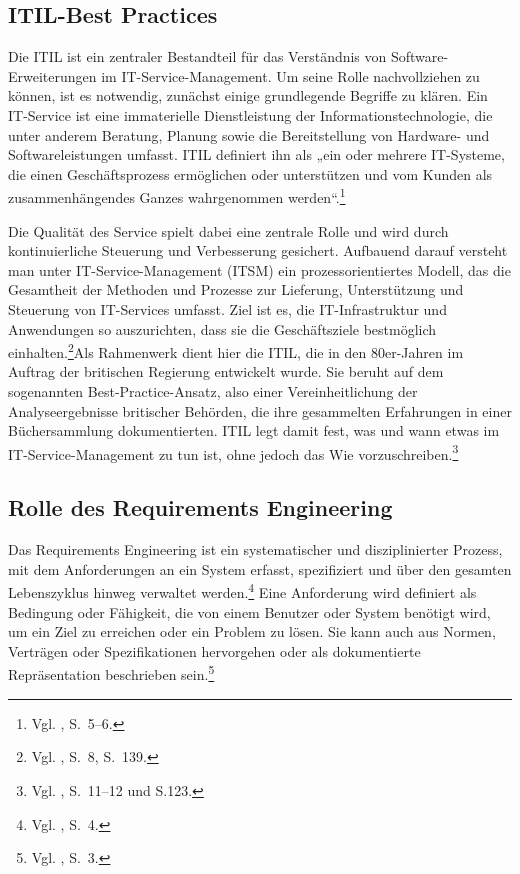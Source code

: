 \documentclass[
    12pt, 
    a4paper,
    ]{scrartcl} %
\begin{document}
\subsection{ITIL-Best Practices}

Die ITIL ist ein zentraler Bestandteil für das Verständnis von Software-Erweiterungen im IT-Service-Management. Um seine Rolle nachvollziehen zu können, ist es notwendig, zunächst einige grundlegende Begriffe zu klären. Ein IT-Service ist eine immaterielle Dienstleistung der Informationstechnologie, die unter anderem Beratung, Planung sowie die Bereitstellung von Hardware- und Softwareleistungen umfasst. ITIL definiert ihn als „ein oder mehrere IT-Systeme, die einen Geschäftsprozess ermöglichen oder unterstützen und vom Kunden als zusammenhängendes Ganzes wahrgenommen werden“.\footnote{Vgl. \cite{S_ITIL}, S.~5--6.} 

Die Qualität des Service spielt dabei eine zentrale Rolle und wird durch kontinuierliche Steuerung und Verbesserung gesichert. Aufbauend darauf versteht man unter IT-Service-Management (ITSM) ein prozessorientiertes Modell, das die Gesamtheit der Methoden und Prozesse zur Lieferung, Unterstützung und Steuerung von IT-Services umfasst. Ziel ist es, die IT-Infrastruktur und Anwendungen so auszurichten, dass sie die Geschäftsziele bestmöglich einhalten.\footnote{Vgl. \cite{S_ITIL}, S.~8, S.~139.}Als Rahmenwerk dient hier die ITIL, die in den 80er-Jahren im Auftrag der britischen Regierung entwickelt wurde. Sie beruht auf dem sogenannten Best-Practice-Ansatz, also einer Vereinheitlichung der Analyseergebnisse britischer Behörden, die ihre gesammelten Erfahrungen in einer Büchersammlung dokumentierten. ITIL legt damit fest, was und wann etwas im IT-Service-Management zu tun ist, ohne jedoch das Wie vorzuschreiben.\footnote{Vgl. \cite{S_ITIL}, S.~11--12 und S.123.}

\subsection{Rolle des Requirements Engineering}

Das Requirements Engineering ist ein systematischer und disziplinierter Prozess, mit dem Anforderungen an ein System erfasst, spezifiziert und über den gesamten Lebenszyklus hinweg verwaltet werden.\footnote{Vgl. \cite{S_PohlRupp}, S.~4.} Eine Anforderung wird definiert als Bedingung oder Fähigkeit, die von einem Benutzer oder System benötigt wird, um ein Ziel zu erreichen oder ein Problem zu lösen. Sie kann auch aus Normen, Verträgen oder Spezifikationen hervorgehen oder als dokumentierte Repräsentation beschrieben sein.\footnote{Vgl. \cite{S_PohlRupp}, S.~3.}
\end{document}
